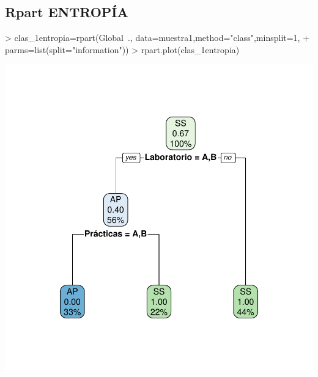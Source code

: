 \documentclass [a4paper] {article}
\begin{document}
\newpage
\subsection{Rpart ENTROPÍA}
\begin{center}
\begin{Schunk}
\begin{Sinput}
> clas_1entropia=rpart(Global~., data=muestra1,method="class",minsplit=1,
+                       parms=list(split="information"))
> rpart.plot(clas_1entropia)
\end{Sinput}
\end{Schunk}
\includegraphics{entrega-rpart1_entropia}
\end{center}

\newpage
\end{document}

